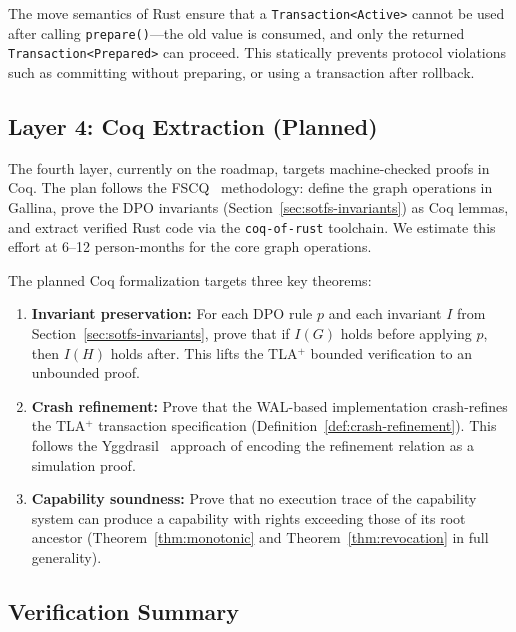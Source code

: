 \documentclass[11pt,a4paper]{article}
\theoremstyle{definition}
\theoremstyle{remark}
\begin{document}
The move semantics of Rust ensure that a \texttt{Transaction<Active>}
cannot be used after calling \texttt{prepare()}---the old value is
consumed, and only the returned \texttt{Transaction<Prepared>} can
proceed. This statically prevents protocol violations such as
committing without preparing, or using a transaction after rollback.

\subsection{Layer 4: Coq Extraction (Planned)}
\label{sec:verif-coq}

The fourth layer, currently on the roadmap, targets machine-checked
proofs in Coq. The plan follows the FSCQ~\cite{chen2015}
methodology: define the graph operations in Gallina, prove the DPO
invariants (Section~\ref{sec:sotfs-invariants}) as Coq lemmas, and
extract verified Rust code via the \texttt{coq-of-rust} toolchain.
We estimate this effort at 6--12 person-months for the core graph
operations.

The planned Coq formalization targets three key theorems:

\begin{enumerate}
\item \textbf{Invariant preservation:} For each DPO rule $p$ and
  each invariant $I$ from Section~\ref{sec:sotfs-invariants}, prove
  that if $I(G)$ holds before applying $p$, then $I(H)$ holds after.
  This lifts the TLA$^+$ bounded verification to an unbounded proof.

\item \textbf{Crash refinement:} Prove that the WAL-based
  implementation crash-refines the TLA$^+$ transaction specification
  (Definition~\ref{def:crash-refinement}). This follows the
  Yggdrasil~\cite{sigurbjarnarson2016} approach of encoding the
  refinement relation as a simulation proof.

\item \textbf{Capability soundness:} Prove that no execution trace
  of the capability system can produce a capability with rights
  exceeding those of its root ancestor (Theorem~\ref{thm:monotonic}
  and Theorem~\ref{thm:revocation} in full generality).
\end{enumerate}

\subsection{Verification Summary}
\label{sec:verif-summary}
\end{document}
